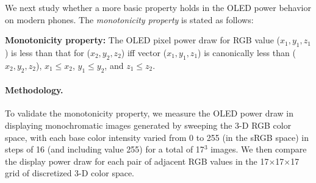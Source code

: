 We next study whether a more basic property holds in the OLED power
behavior on modern phones.  The {\em monotonicity property} is stated
as follows:

\noindent
{\bf Monotonicity property:}
The OLED pixel power draw for RGB value ($x_1, y_1, z_1$)
is less than that for ($x_2, y_2, z_2$) iff
vector ($x_1, y_1, z_1$) is canonically less than ($x_2, y_2, z_2$),
\ie $x_1 \leq x_2$, $y_1 \leq y_2$, and $z_1 \leq z_2$.

\paragraph{Methodology.}
To validate the monotonicity property, we measure the OLED power draw
in displaying monochromatic images generated by sweeping the 3-D RGB
color space, with each base color intensity varied from 0 to 255 (in
the sRGB space) in steps of 16 (and including value 255) for a total
of 17$^3$ images. We then compare the display power
draw for each pair of adjacent RGB values in the
17$\times$17$\times$17 grid of discretized 3-D color space.





